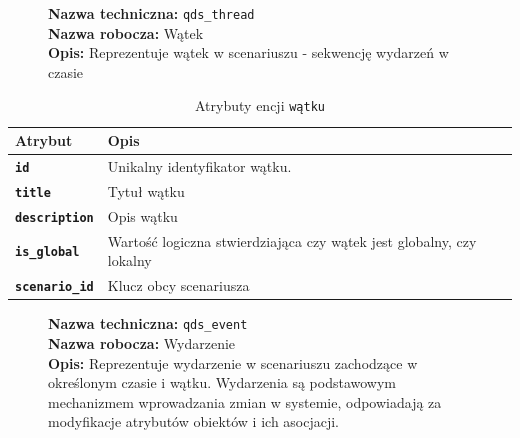 \begin{figure}[H]
    \centering
    \begin{minipage}{0.8\textwidth}
        \begin{framed}
            \noindent\textbf{\large Nazwa techniczna:} \texttt{qds\_thread} \\
            \textbf{\large Nazwa robocza:} Wątek \\
            \textbf{\large Opis:} Reprezentuje wątek w scenariuszu - sekwencję wydarzeń w czasie
        \end{framed}
    \end{minipage}
\end{figure}

\begin{table}[H]
    \centering
    \renewcommand{\arraystretch}{1.6}
    \begin{tabular}{|>{\bfseries}l|p{}|}
        \hline
        \rowcolor[HTML]{EFEFEF} \textbf{Atrybut} & \textbf{Opis} \\
        \hline
        \texttt{id} & Unikalny identyfikator wątku. \\
        \hline
        \texttt{title} & Tytuł wątku \\
        \hline
        \texttt{description} & Opis wątku \\
        \hline
        \texttt{is\_global} & Wartość logiczna stwierdziająca czy wątek jest globalny, czy lokalny \\
        \hline
        \texttt{scenario\_id} & Klucz obcy scenariusza \\
        \hline
    \end{tabular}
    \caption{Atrybuty encji \texttt{wątku}}
\end{table}

\begin{figure}[H]
    \centering
    \begin{minipage}{0.8\textwidth}
        \begin{framed}
            \noindent\textbf{\large Nazwa techniczna:} \texttt{qds\_event} \\
            \textbf{\large Nazwa robocza:} Wydarzenie \\
            \textbf{\large Opis:} Reprezentuje wydarzenie w scenariuszu zachodzące w określonym czasie i wątku.
            Wydarzenia są podstawowym mechanizmem wprowadzania zmian w systemie,
            odpowiadają za modyfikacje atrybutów obiektów i ich asocjacji.
        \end{framed}
    \end{minipage}
\end{figure}

